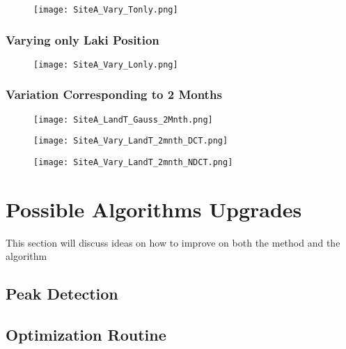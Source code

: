 \documentclass[../../CompleteThesis2/Complete_2ndDraft]{subfiles}
\begin{document}
\begin{figure}[h]
	\centering
	\texttt{[image: SiteA\_Vary\_Tonly.png]}
	\caption[]{\footnotesize }
	\label{fig:SiteA_Vary_Tonly}
\end{figure}



\subsubsection[Vary L]{Varying only Laki Position}
\label{Subsubsec:Method_TestStab_LTlocations_L}

\begin{figure}[h]
	\centering
	\texttt{[image: SiteA\_Vary\_Lonly.png]}
	\caption[]{\footnotesize }
	\label{fig:SiteA_Vary_Lonly}
\end{figure}



\subsubsection[2 Month Variability]{Variation Corresponding to 2 Months}
\label{Subsubsec:Method_TestStab_LTlocations_2Month}

\begin{figure}[h]
	\centering
	\texttt{[image: SiteA\_LandT\_Gauss\_2Mnth.png]}
	\caption[]{\footnotesize }
	\label{fig:SiteA_LandT_Gauss_2Mnth}
\end{figure}

\begin{figure}[h]
	\centering
	\texttt{[image: SiteA\_Vary\_LandT\_2mnth\_DCT.png]}
	\caption[]{\footnotesize }
	\label{fig:SiteA_LandT_Gauss_2mnth_DCT}
\end{figure}

\begin{figure}[h]
	\centering
	\texttt{[image: SiteA\_Vary\_LandT\_2mnth\_NDCT.png]}
	\caption[]{\footnotesize }
	\label{fig:SiteA_LandT_Gauss_2mnth_NDCT}
\end{figure}



\section[Upgrades][Upgrades]{Possible Algorithms Upgrades}
\label{Sec:Method_Upgrades}

This section will discuss ideas on how to improve on both the method and the algorithm

\subsection[Peak Detection]{Peak Detection}
\label{Subsec:Method_Upgrades_PeakDet}

\subsection[Optimization Routine]{Optimization Routine}
\label{Subsec:Method_Upgrades_OptiRout}
\end{document}
